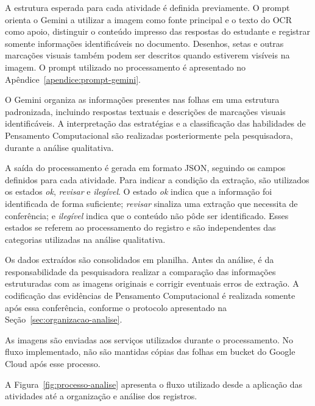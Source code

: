 A estrutura esperada para cada atividade é definida previamente. O prompt orienta o Gemini a utilizar a imagem como fonte principal e o texto do OCR como apoio, distinguir o conteúdo impresso das respostas do estudante e registrar somente informações identificáveis no documento. Desenhos, setas e outras marcações visuais também podem ser descritos quando estiverem visíveis na imagem. O prompt utilizado no processamento é apresentado no Apêndice~\ref{apendice:prompt-gemini}.

O Gemini organiza as informações presentes nas folhas em uma estrutura padronizada, incluindo respostas textuais e descrições de marcações visuais identificáveis. A interpretação das estratégias e a classificação das habilidades de Pensamento Computacional são realizadas posteriormente pela pesquisadora, durante a análise qualitativa.

A saída do processamento é gerada em formato JSON, seguindo os campos definidos para cada atividade. Para indicar a condição da extração, são utilizados os estados \textit{ok}, \textit{revisar} e \textit{ilegível}. O estado \textit{ok} indica que a informação foi identificada de forma suficiente; \textit{revisar} sinaliza uma extração que necessita de conferência; e \textit{ilegível} indica que o conteúdo não pôde ser identificado. Esses estados se referem ao processamento do registro e são independentes das categorias utilizadas na análise qualitativa.

Os dados extraídos são consolidados em planilha. Antes da análise, é da responsabilidade da pesquisadora realizar a comparação das informações estruturadas com as imagens originais e corrigir eventuais erros de extração. A codificação das evidências de Pensamento Computacional é realizada somente após essa conferência, conforme o protocolo apresentado na Seção~\ref{sec:organizacao-analise}.

As imagens são enviadas aos serviços utilizados durante o processamento. No fluxo implementado, não são mantidas cópias das folhas em bucket do Google Cloud após esse processo.

A Figura~\ref{fig:processo-analise} apresenta o fluxo utilizado desde a aplicação das atividades até a organização e análise dos registros.


